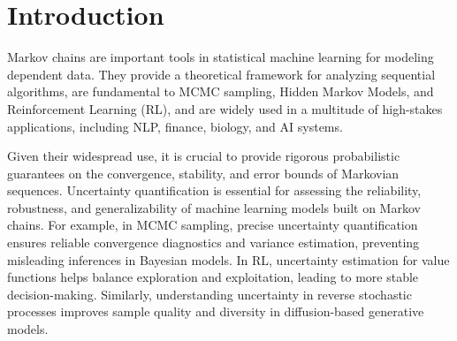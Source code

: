 \section{Introduction}







Markov chains are important tools in statistical machine learning for modeling dependent data.
They provide a theoretical framework for analyzing sequential algorithms, are fundamental to MCMC sampling, Hidden Markov Models, and Reinforcement Learning (RL), and are widely used in a multitude of high-stakes applications, including NLP, finance, biology, and AI systems. 


Given their widespread use, it is crucial to provide rigorous probabilistic guarantees on the convergence, stability, and error bounds of Markovian sequences. Uncertainty quantification is essential for assessing the reliability, robustness, and generalizability of machine learning models built on Markov chains. For example, in MCMC sampling, precise uncertainty quantification ensures reliable convergence diagnostics and variance estimation, preventing misleading inferences in Bayesian models. In RL, uncertainty estimation for value functions helps balance exploration and exploitation, leading to more stable decision-making. Similarly, understanding uncertainty in reverse stochastic processes improves sample quality and diversity in diffusion-based generative models.

